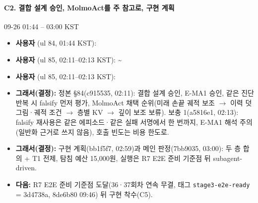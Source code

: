 \paragraph{C2. 결합 설계 승인, MolmoAct를 주 참고로, 구현 계획}
{\small 09-26 01:44 -- 03:00 KST}
\begin{itemize}
  \item \textbf{사용자} (ul 84, 01:44 KST): 
  \item \textbf{사용자} (ul 85, 02:11--02:13 KST): \textasciitilde{}
  \item \textbf{사용자} (ul 85, 02:11--02:13 KST): 
  \item \textbf{그래서(결정):} 정본 §84(c915535, 02:11): 결합 설계 승인, E-MA1 승인, 같은 진단 반복 시 falsify 먼저 평가, MolmoAct 채택 순위(미래 손끝 궤적 보조 $\rightarrow$ 이력 덧그림·궤적 조건 $\rightarrow$ 층별 KV $\rightarrow$ 깊이 보조 보류). 보충 1(a5816e1, 02:13): falsify 재사용은 같은 에피소드·같은 실패 서명에서 한 번까지, E-MA1 해석 주의(일반화 근거로 쓰지 않음), 호출 빈도는 비용 한도로.
  \item \textbf{그래서(결정):} 구현 계획(bb1f5f7, 02:59)과 메인 판정(7bb9035, 03:00): 두 층 합의 + T1 전제, 탐침 예산 15,000원, 실행은 R7 E2E 준비 기준점 뒤 subagent-driven.
  \item \textbf{다음:} R7 E2E 준비 기준점 도달(36·37회차 연속 무결, 태그 \texttt{stage3-\allowbreak{}e2e-\allowbreak{}ready} = 3d4738a, 8de6b80 09:46) 뒤 구현 착수(C5).
\end{itemize}

